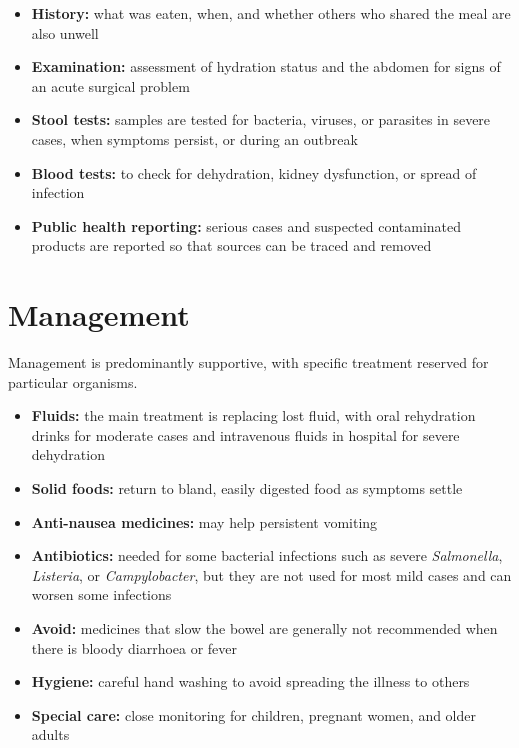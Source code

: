 \begin{itemize}
    \item \textbf{History:} what was eaten, when, and whether others who shared the meal are also unwell
    \item \textbf{Examination:} assessment of hydration status and the abdomen for signs of an acute surgical problem
    \item \textbf{Stool tests:} samples are tested for bacteria, viruses, or parasites in severe cases, when symptoms persist, or during an outbreak
    \item \textbf{Blood tests:} to check for dehydration, kidney dysfunction, or spread of infection
    \item \textbf{Public health reporting:} serious cases and suspected contaminated products are reported so that sources can be traced and removed
\end{itemize}

\section*{Management}
Management is predominantly supportive, with specific treatment reserved for particular organisms.

\begin{itemize}
    \item \textbf{Fluids:} the main treatment is replacing lost fluid, with oral rehydration drinks for moderate cases and intravenous fluids in hospital for severe dehydration
    \item \textbf{Solid foods:} return to bland, easily digested food as symptoms settle
    \item \textbf{Anti-nausea medicines:} may help persistent vomiting
    \item \textbf{Antibiotics:} needed for some bacterial infections such as severe \textit{Salmonella}, \textit{Listeria}, or \textit{Campylobacter}, but they are not used for most mild cases and can worsen some infections
    \item \textbf{Avoid:} medicines that slow the bowel are generally not recommended when there is bloody diarrhoea or fever
    \item \textbf{Hygiene:} careful hand washing to avoid spreading the illness to others
    \item \textbf{Special care:} close monitoring for children, pregnant women, and older adults
\end{itemize}

